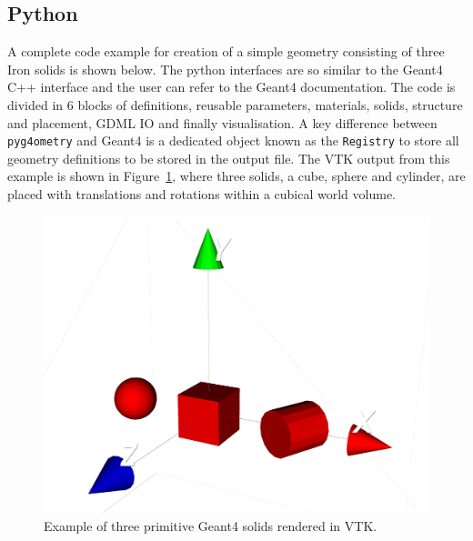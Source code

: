 \documentclass[a4paper,
               keeplastbox,   %
               ]{jacow}
\begin{document}
\subsection{Python}
A complete code example for creation of a simple geometry consisting of three Iron solids is shown below. The python interfaces are so similar to the Geant4 C++ interface and the user can refer to the Geant4 documentation.  
The code is divided in 6 blocks of definitions, reusable parameters, materials, solids, structure and placement, GDML IO and finally visualisation. A key difference between \verb|pyg4ometry| and Geant4 is a dedicated object known as the \verb|Registry| to store all geometry definitions to be stored in the output file. The VTK output from this example is shown in Figure~\ref{fig:simple}, where three solids, a cube, sphere and cylinder, are placed with translations and rotations within a cubical world volume.
\begin{figure}[!htb]
   \centering
   \includegraphics*[width=.9\columnwidth]{./examples/simple.jpg}
   \caption{Example of three primitive Geant4 solids rendered in VTK.}
   \label{fig:simple}
\end{figure}
\end{document}
